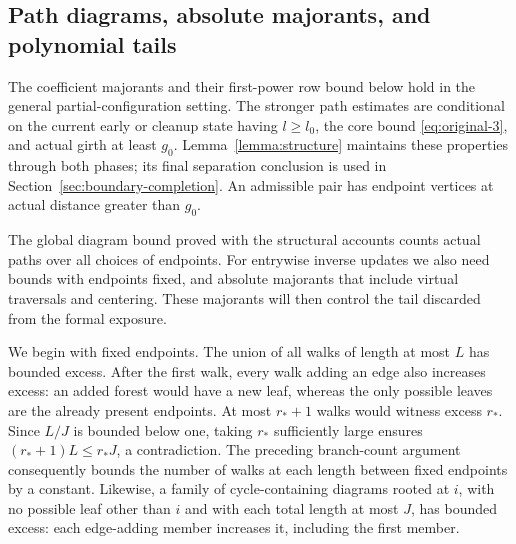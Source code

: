 \subsection{Path diagrams, absolute majorants, and polynomial tails}

The coefficient majorants and their first-power row bound below hold
in the general partial-configuration setting. The stronger path estimates
are conditional on the current early or cleanup state having $l\ge l_0$,
the core bound \eqref{eq:original-3}, and actual girth at least $g_0$.
Lemma~\ref{lemma:structure} maintains these properties through both
phases; its final separation conclusion is used in
Section~\ref{sec:boundary-completion}. An admissible pair has endpoint
vertices at actual distance greater than $g_0$.

The global diagram bound proved with the structural accounts counts
actual paths over all choices of endpoints. For entrywise inverse
updates we also need bounds with endpoints fixed, and absolute
majorants that include virtual traversals and centering. These
majorants will then control the tail discarded from the formal exposure.

We begin with fixed endpoints. The union of all walks
of length at most $L$ has bounded excess. After the first walk, every walk adding an edge also
increases excess: an added forest would have a new leaf, whereas the
only possible leaves are the already present endpoints. At most
$r_*+1$ walks would witness excess $r_*$. Since $L/J$ is bounded below
one, taking $r_*$ sufficiently large ensures
$(r_*+1)L\le r_*J$, a contradiction. The preceding branch-count
argument consequently bounds the number of walks at each length
between fixed endpoints by a constant. Likewise, a family of
cycle-containing diagrams rooted at $i$, with no possible leaf other
than $i$ and with each total length at most $J$, has bounded excess:
each edge-adding member increases it, including the first member.

